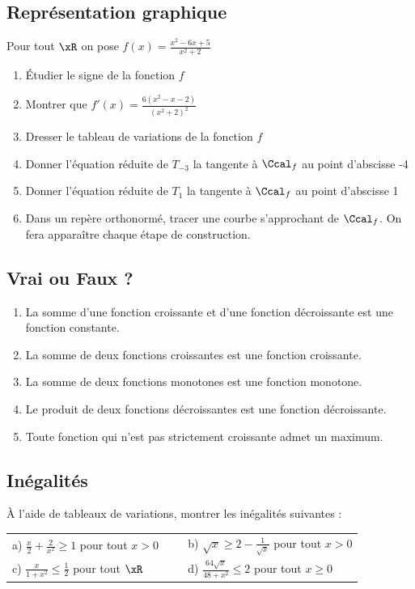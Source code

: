 \documentclass[oneside,12pt]{book}          %
\begin{document}
\subsection{Représentation graphique}
Pour tout $\xR$ on pose $f(x)=\frac{x^2-6x+5}{x^2+2}$
\begin{enumerate}
	\item Étudier le signe de la fonction $f$
	\item Montrer que $f'(x)=\frac{6(x^2-x-2)}{(x^2+2)^2}$
	\item Dresser le tableau de variations de la fonction $f$
	\item Donner l'équation réduite de $T_{-3}$ la tangente à $\Ccal_f$ au point d'abscisse -4
	\item Donner l'équation réduite de $T_1$ la tangente à $\Ccal_f$ au point d'abscisse 1
	\item Dans un repère orthonormé, tracer une courbe s'approchant de $\Ccal_f$. On fera apparaître chaque étape de construction.
\end{enumerate}



\subsection{Vrai ou Faux ?}
\begin{enumerate}
	\item La somme d'une fonction croissante et d'une fonction décroissante est une fonction constante.
	\item La somme de deux fonctions croissantes est une fonction croissante.
	\item La somme de deux fonctions monotones est une fonction monotone.
	\item Le produit de deux fonctions décroissantes est une fonction décroissante.
	\item Toute fonction qui n'est pas strictement croissante admet un maximum.
\end{enumerate}



\subsection{Inégalités}
À l'aide de tableaux de variations, montrer les inégalités suivantes :

\begin{tabular}{p{0.5\linewidth} p{0.5\linewidth}}
    a) $\frac{x}{2}+\frac{2}{x^2}\geq1$ \quad pour tout $x>0$ &
    
    b) $\sqrt{x} \geq 2 -\frac{1}{\sqrt{x}}$ \quad pour tout $x>0$ \\
    
    c) $\frac{x}{1+x^2}\leq\frac{1}{2}$ \quad pour tout $\xR$ &
    
    d) $\frac{64\sqrt{x}}{48+x^2}\leq 2$ \quad pour tout $x\geq0$ \\
\end{tabular}
\end{document}

